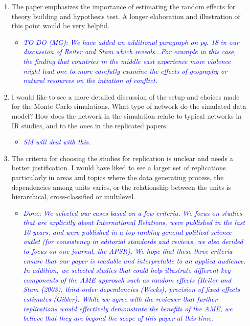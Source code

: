 \begin{enumerate}
\begin{itemize}
{{		}}
	\end{itemize}
	\item The paper emphasizes the importance of estimating the random effects for theory building and hypothesis test. A longer elaboration and illustration of this point would be very helpful.
	\begin{itemize}
		\item \textcolor{blue}{ \emph{
		TO DO (MG): We have added an additional paragraph on pg. 18 in our discussion of Reiter and Stam which reveals...For example in this case, the finding that countries in the middle east experience more violence might lead one to more carefully examine the effects of geography or natural resources on the intiation of conflict.
		}}
	\end{itemize}
	\item I would like to see a more detailed discussion of the setup and choices made for the Monte Carlo simulations. What type of network do the simulated data model? How does the network in the simulation relate to typical networks in IR studies, and to the ones in the replicated papers.
	\begin{itemize}
		\item \textcolor{blue}{ \emph{
		SM will deal with this.
		}}
	\end{itemize}
	\item The criteria for choosing the studies for replication is unclear and needs a better justification. I would have liked to see a larger set of replications particularly in areas and topics where the data generating process, the dependencies among units varies, or the relationship between the units is hierarchical, cross-classified or multilevel.
	\begin{itemize}
		\item \textcolor{blue}{ \emph{
		Done: We selected our cases based on a few criteria. We focus on studies that are explicitly about International Relations, were published in the last 10 years, and were published in a top ranking general political science outlet (for consistency in editorial standards and reviews, we also decided to focus on one journal, the APSR). We hope that these three criteria ensure that our paper is readable and interpretable to an applied audience. In addition, we selected studies that could help illustrate different key components of the AME approach such as random effects (Reiter and Stam (2003), third-order dependencies (Weeks), precision of fixed effects estimates (Gibler).  While we agree with the reviewer that further replications would effectively demonstrate the benefits of the AME, we believe that they are beyond the scope of this paper at this time.
}}
\end{itemize}
\end{enumerate}
